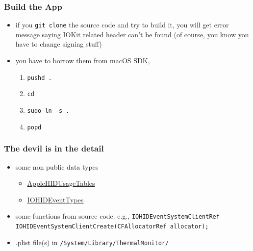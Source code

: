 \documentclass{beamer}
\begin{document}
\begin{frame}
  \frametitle{Build the App}
  \begin{itemize}
  \item if you \texttt{git clone} the source code and try to build it, you will get error message saying IOKit related header can't be found (of course, you know you have to change signing stuff)
  \item you have to borrow them from macOS SDK,
    \begin{enumerate}
    \item \texttt{pushd .}
    \item \texttt{cd }
    \item \texttt{sudo ln -s  .}
    \item \texttt{popd}
    \end{enumerate}
  \end{itemize}
\end{frame}

\begin{frame}
  \frametitle{The devil is in the detail}
  \begin{itemize}
  \item some non public data types
    \begin{itemize}
    \item \href{https://opensource.apple.com/source/IOHIDFamily/IOHIDFamily-701.60.2/IOHIDFamily/AppleHIDUsageTables.h.auto.html}{AppleHIDUsageTables}
    \item \href{https://opensource.apple.com/source/IOHIDFamily/IOHIDFamily-701.60.2/IOHIDFamily/IOHIDEventTypes.h.auto.html}{IOHIDEventTypes}
    \end{itemize}
  \item some functions from source code. e.g., \texttt{IOHIDEventSystemClientRef IOHIDEventSystemClientCreate(CFAllocatorRef allocator);}
  \item .plist file(s) in \texttt{/System/Library/ThermalMonitor/}
  \end{itemize}
\end{frame}
\end{document}
